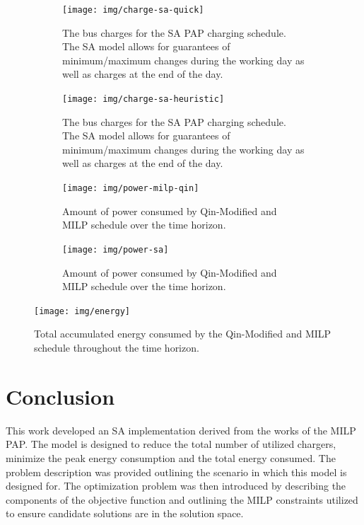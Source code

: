 \documentclass[11pt,a4paper,final]{article}
\begin{document}
\begin{figure}\ContinuedFloat
  \begin{subfigure}[t]{\textwidth}
    \centering
    \texttt{[image: img/charge-sa-quick]}
    \caption{The bus charges for the SA PAP charging schedule. The SA model allows for guarantees of minimum/maximum changes during the working day as well as charges at the end of the day.}
    \label{subfig:sa-quick-charge}
  \end{subfigure}
  \hfill
  \begin{subfigure}[t]{\textwidth}
    \centering
    \texttt{[image: img/charge-sa-heuristic]}
    \caption{The bus charges for the SA PAP charging schedule. The SA model allows for guarantees of minimum/maximum changes during the working day as well as charges at the end of the day.}
    \label{subfig:sa-heuristic-charge}
  \end{subfigure}
  \caption{}
  \label{fig:charge}
\end{figure}

\begin{figure}
  \begin{subfigure}[t]{\textwidth}
    \centering
    \texttt{[image: img/power-milp-qin]}
    \caption{Amount of power consumed by Qin-Modified and MILP schedule over the time horizon.}
    \label{fig:power-usage-milp-qin}
  \end{subfigure}

  \hfill

  \begin{subfigure}[t]{\textwidth}
    \centering
    \texttt{[image: img/power-sa]}
    \caption{Amount of power consumed by Qin-Modified and MILP schedule over the time horizon.}
    \label{fig:power-usage-sa}
  \end{subfigure}
  \caption{}
  \label{fig:power}
\end{figure}

\begin{figure}[htpb]
\centering \texttt{[image: img/energy]}
    \caption{Total accumulated energy consumed by the Qin-Modified and MILP schedule throughout the time horizon.}
    \label{fig:energy-usage}
\end{figure}


\section{Conclusion}
\label{sec:conclusion}
This work developed an SA implementation derived from the works of the MILP PAP. The model is designed to reduce the
total number of utilized chargers, minimize the peak energy consumption and the total energy consumed. The problem
description was provided outlining the scenario in which this model is designed for. The optimization problem was then
introduced by describing the components of the objective function and outlining the MILP constraints utilized to ensure
candidate solutions are in the solution space.
\end{document}
